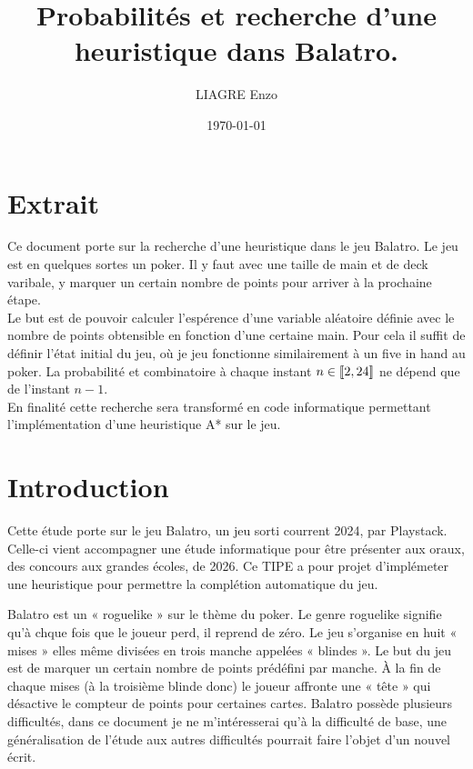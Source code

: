 \documentclass[10pt]{report}
\title{Probabilités et recherche d'une heuristique dans Balatro.}
\author{LIAGRE Enzo}
\date{\today}
\begin{document}
    \maketitle

    \chapter*{Extrait}
    Ce document porte sur la recherche d'une heuristique dans le jeu Balatro.
    Le jeu est en quelques sortes un poker. Il y faut avec une taille de main et de deck varibale, y marquer un certain nombre de points pour arriver à la prochaine étape.
    \\ Le but est de pouvoir calculer l'espérence d'une variable aléatoire définie avec le nombre de points obtensible en fonction d'une certaine main.
    Pour cela il suffit de définir l'état initial du jeu, où je jeu fonctionne similairement à un five in hand au poker.
    La probabilité et combinatoire à chaque instant $n \in [\![2, \space 24]\!]$ ne dépend que de l'instant $n-1$.
    \\ En finalité cette recherche sera transformé en code informatique permettant l'implémentation d'une heuristique A* sur le jeu.

    \tableofcontents

    \chapter{Introduction}
    Cette étude porte sur le jeu Balatro, un jeu sorti courrent 2024, par Playstack.
    Celle-ci vient accompagner une étude informatique pour être présenter aux oraux, des concours aux grandes écoles, de 2026.
    Ce TIPE a pour projet d'implémeter une heuristique pour permettre la complétion automatique du jeu. 
    
    Balatro est un « roguelike » sur le thème du poker. Le genre roguelike signifie qu'à chque fois que le joueur perd, il reprend de zéro.
    Le jeu s'organise en huit « mises » elles même divisées en trois manche appelées « blindes ».
    Le but du jeu est de marquer un certain nombre de points prédéfini par manche.
    À la fin de chaque mises (à la troisième blinde donc) le joueur affronte une « tête » qui désactive le compteur de points pour certaines cartes.
    Balatro possède plusieurs difficultés, dans ce document je ne m'intéresserai qu'à la difficulté de base, une généralisation de l'étude aux autres difficultés pourrait faire l'objet d'un nouvel écrit.
\end{document}
